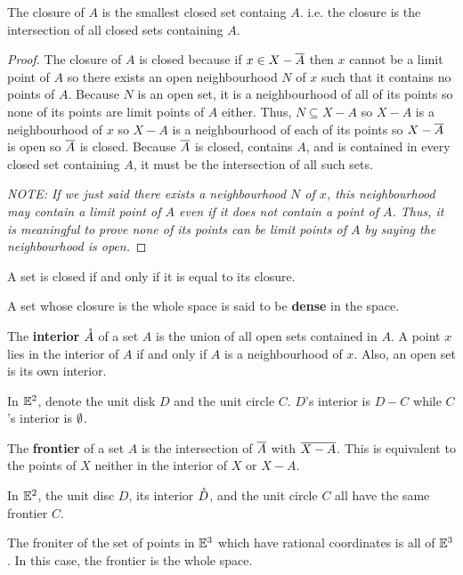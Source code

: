 \begin{theorem}
    The closure of $A$ is the smallest closed set containg $A$. i.e. the closure is the intersection of all closed sets containing $A$.
\end{theorem}
\begin{proof}
    The closure of $A$ is closed because if $x \in X-\overline{A}$ then $x$ cannot be a limit point of $A$ so there exists an open neighbourhood $N$ of $x$ such that it contains no points of $A$. Because $N$ is an open set, it is a neighbourhood of all of its points so none of its points are limit points of $A$ either. Thus, $N \subseteq X-A$ so $X-A$ is a neighbourhood of $x$ so $X-A$ is a neighbourhood of each of its points so $X-\overline{A}$ is open so $\overline{A}$ is closed. Because $\overline{A}$ is closed, contains $A$, and is contained in every closed set containing $A$, it must be the intersection of all such sets.

    \emph{NOTE: If we just said there exists a neighbourhood $N$ of $x$, this neighbourhood may contain a limit point of $A$ even if it does not contain a point of $A$. Thus, it is meaningful to prove none of its points can be limit points of $A$ by saying the neighbourhood is open.}
\end{proof}
\begin{corollary}
    A set is closed if and only if it is equal to its closure.
\end{corollary}
\begin{definition}[Dense]
    A set whose closure is the whole space is said to be \textbf{dense} in the space.
\end{definition}
\begin{definition}[Interior]
    The \textbf{interior} $\mathring{A}$ of a set $A$ is the union of all open sets contained in $A$. A point $x$ lies in the interior of $A$ if and only if $A$ is a neighbourhood of $x$. Also, an open set is its own interior.
\end{definition}
\begin{example}
    In $\mathbb{E}^2$, denote the unit disk $D$ and the unit circle $C$. $D$'s interior is $D-C$ while $C$'s interior is $\emptyset$. 
\end{example}
\begin{definition}[Frontier]
    The \textbf{frontier} of a set $A$ is the intersection of $\overline{A}$ with $\overline{X-A}$. This is equivalent to the points of $X$ neither in the interior of $X$ or $X-A$.
\end{definition}
\begin{example}
    In $\mathbb{E}^2$, the unit disc $D$, its interior $\mathring{D}$, and the unit circle $C$ all have the same frontier $C$.

    The froniter of the set of points in $\mathbb{E}^3$ which have rational coordinates is all of $\mathbb{E}^3$. In this case, the frontier is the whole space.
\end{example}
